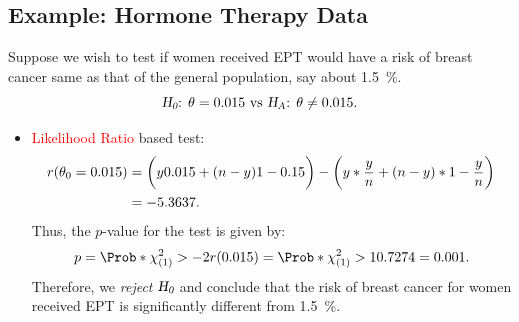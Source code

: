 \documentclass{article}\usepackage[]{graphicx}\usepackage[svgnames]{xcolor}
\let\log\relax%
\newcommand{\HN}{\textsl{H}_{\textsl{0}}}%
\newcommand{\HA}{\textsl{H}_{\textsl{A}}}%
\begin{document}
\subsection*{Example: Hormone Therapy Data}
Suppose we wish to test if women received EPT would have a risk of breast
cancer same as that of the general population, say about \qty{1.5}{\percent}.
\[ \text{$\HN$: $\theta=0.015$ vs $\HA$: $\theta\ne 0.015$.} \]
\begin{itemize}
      \item \textcolor{Red}{Likelihood Ratio} based test:
            \begin{align*}
                  r(\theta_0=0.015)
                   & =\biggl(y\log{0.015}+(n-y)\log{1-0.15}\biggr)-\biggl(y\log*{\frac{y}{n}}+(n-y)\log*{1-\frac{y}{n} }\biggr) \\
                   & =-5.3637.
            \end{align*}
            Thus, the $ p $-value for the test is given by:
            \[ p=\Prob*{\chi^2_{(1)}>-2r(0.015)}=\Prob*{\chi^2_{(1)}>10.7274}=0.001. \]
            Therefore, we \emph{reject} $ \HN $ and conclude that the risk of breast cancer for women received EPT is
            significantly different from \qty{1.5}{\percent}.
\end{itemize}
\end{document}
